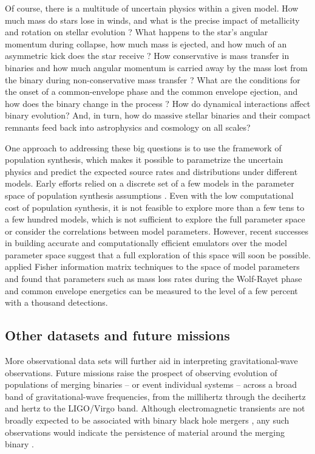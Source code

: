 \documentclass[iop,onecolumn]{revtex4}
\newcommand{\todo}[1]{\textcolor{red}{#1}}
\begin{document}
Of course, there is a multitude of uncertain physics within a given model.  How much mass do stars lose in winds, and what is the precise impact of metallicity and rotation on stellar evolution \citep[e.g.,][]{Renzo:2017}?  What happens to the star's angular momentum during collapse, how much mass is ejected, and how much of an asymmetric kick does the star receive \citep[e.g.,][]{Mirabel:2016}? How conservative is mass transfer in binaries and how much angular momentum is carried away by the mass lost from the binary during non-conservative mass transfer \citep[e.g.,][]{vandenHeuvel:2017}?  What are the conditions for the onset of a common-envelope phase and the common envelope ejection, and how does the binary change in the process \citep[e.g.,][]{Ivanova:2013}?   How do dynamical interactions affect binary evolution?  And, in turn, how do massive stellar binaries and their compact remnants feed back into astrophysics and cosmology on all scales?

One approach to addressing these big questions is to use the framework of population synthesis, which makes it possible to parametrize the uncertain physics and predict the expected source rates and distributions under different models.  Early  efforts relied on a discrete set of a few models in the parameter space of population synthesis assumptions \citep{Dominik:2012,Stevenson:2015}.  Even with the low computational cost of population synthesis, it is not feasible to explore more than a few tens to a few hundred models, which is not sufficient to explore the full parameter space or consider the correlations between model parameters.  However, recent successes in building accurate and computationally efficient emulators over the model parameter space \citep{Barrett:2017} suggest that a full exploration of this space will soon be possible. \citet{Barrett:2017FIM} applied Fisher information matrix techniques to the space of model parameters and found that parameters such as mass loss rates during the Wolf-Rayet phase and common envelope energetics can be measured to the level of a few percent with a thousand detections. 

\subsection{Other datasets and future missions}
More observational data sets will further aid in interpreting gravitational-wave observations.  Future missions raise the prospect of observing evolution of populations of merging binaries -- or event individual systems -- across a broad band of gravitational-wave frequencies, from the millihertz \citep[e.g.,][]{Sesana:2016} through the decihertz \citep{Mandel:2017} and hertz \citep{ET:2012} to the LIGO/Virgo band.  Although electromagnetic transients are not broadly expected to be associated with binary black hole mergers \citep[e.g.,][]{Lyutikov:2016}, any such observations would indicate the persistence of material around the merging binary \citep[e.g.,][]{deMinkKing:2017}.  %
\end{document}
